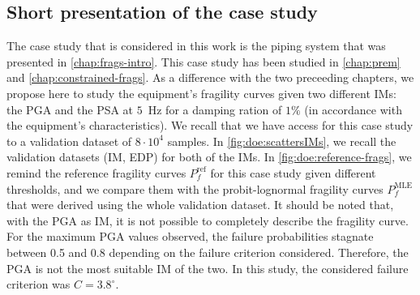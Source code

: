     \subsection{Short presentation of the case study}\label{sec:doe:appli:subsec:present}

The case study that is considered in this work is the piping system that was presented in \cref{chap:frags-intro}.
This case study has been studied in \cref{chap:prem} and \cref{chap:constrained-frags}. As a difference with the two preceeding chapters, we propose here to study the equipment's fragility curves given two different IMs: the PGA and the PSA at $5$~Hz for a damping ration of $1\%$ (in accordance with the equipment's characteristics). 
We recall that we have access for this case study to a validation dataset of $8\cdot 10^4$ samples.
In \cref{fig:doe:scattersIMs}, we recall the validation datasets (IM, EDP) for both of the IMs. In \cref{fig:doe:reference-frags}, we remind the reference fragility curves $P^{\text{ref}}_f$ for this case study given different thresholds, and we compare them with the probit-lognormal fragility curves $P_f^{\text{MLE}}$ that were derived  using the whole validation dataset.
It should be noted that, with the PGA as IM, it is not possible to completely describe the fragility curve. For the maximum PGA values observed, the failure probabilities stagnate between 0.5 and 0.8 depending on the failure criterion considered. Therefore, the PGA is not the most suitable IM of the two.
In this study, the considered failure criterion was $C=3.8^\circ$.


